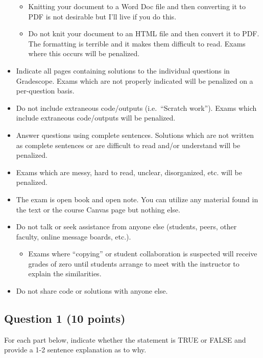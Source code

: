 \documentclass[
]{article}
\providecommand{\tightlist}{%
  \setlength{\itemsep}{0pt}\setlength{\parskip}{0pt}}
\begin{document}
\begin{itemize}
  \begin{itemize}
  \tightlist
  \item
    Knitting your document to a Word Doc file and then converting it to
    PDF is not desirable but I'll live if you do this.
  \item
    Do not knit your document to an HTML file and then convert it to
    PDF. The formatting is terrible and it makes them difficult to read.
    Exams where this occurs will be penalized.
  \end{itemize}
\item
  Indicate all pages containing solutions to the individual questions in
  Gradescope. Exams which are not properly indicated will be penalized
  on a per-question basis.
\item
  Do not include extraneous code/outputs (i.e.~``Scratch work''). Exams
  which include extraneous code/outputs will be penalized.
\item
  Answer questions using complete sentences. Solutions which are not
  written as complete sentences or are difficult to read and/or
  understand will be penalized.
\item
  Exams which are messy, hard to read, unclear, disorganized, etc. will
  be penalized.
\item
  The exam is open book and open note. You can utilize any material
  found in the text or the course Canvas page but nothing else.
\item
  Do not talk or seek assistance from anyone else (students, peers,
  other faculty, online message boards, etc.).

  \begin{itemize}
  \tightlist
  \item
    Exams where ``copying'' or student collaboration is suspected will
    receive grades of zero until students arrange to meet with the
    instructor to explain the similarities.
  \end{itemize}
\item
  Do not share code or solutions with anyone else.
\end{itemize}

\newpage

\hypertarget{question-1-10-points}{%
\subsection{Question 1 (10 points)}\label{question-1-10-points}}

For each part below, indicate whether the statement is TRUE or FALSE and
provide a 1-2 sentence explanation as to why.
\end{document}

